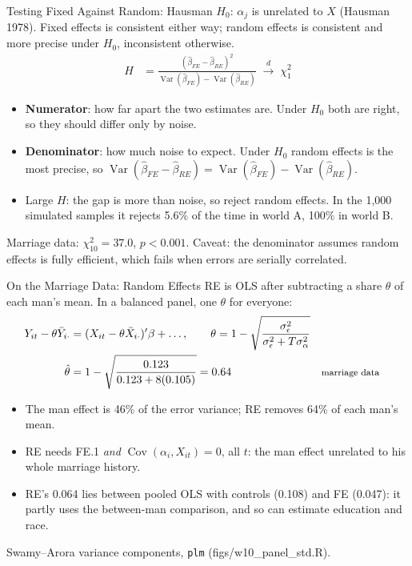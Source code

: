 \documentclass[aspectratio=169,11pt,xcolor=dvipsnames]{beamer}
\newcommand{\srcp}[1]{{\scriptsize\color{gray}(#1)}}
\DeclareMathOperator{\Cov}{Cov}
\DeclareMathOperator{\Var}{Var}
\newcommand{\dto}{\overset{d}{\longrightarrow}}
\begin{document}
\begin{frame}{Testing Fixed Against Random: Hausman}
$H_0$: $\alpha_j$ is unrelated to $X$ \srcp{Hausman 1978}. Fixed effects is consistent either way;
random effects is consistent and more precise under $H_0$, inconsistent otherwise.
\begin{align*}
  H &= \frac{(\hat\beta_{FE} - \hat\beta_{RE})^2}{\Var(\hat\beta_{FE}) - \Var(\hat\beta_{RE})}
   \;\dto\; \chi^2_1
\end{align*}
\begin{itemize}\itemsep3pt
  \item \textbf{Numerator}: how far apart the two estimates are. Under $H_0$ both are right,
        so they should differ only by noise.
  \item \textbf{Denominator}: how much noise to expect. Under $H_0$ random effects is the
        most precise, so $\Var(\hat\beta_{FE} - \hat\beta_{RE}) = \Var(\hat\beta_{FE}) - \Var(\hat\beta_{RE})$.
  \item Large $H$: the gap is more than noise, so reject random effects. In the 1,000
        simulated samples it rejects 5.6\% of the time in world A, 100\% in world B.
\end{itemize}
\vskip2pt
{\small Marriage data: $\chi^2_{10} = 37.0$, $p < 0.001$. Caveat: the denominator assumes random
effects is fully efficient, which fails when errors are serially correlated.}
\end{frame}

\begin{frame}{On the Marriage Data: Random Effects}
RE is OLS after subtracting a share $\theta$ of each man's mean.
In a balanced panel, one $\theta$ for everyone:
\begin{align*}
  Y_{it} - \theta\bar Y_{i\cdot} &= (X_{it} - \theta\bar X_{i\cdot})'\beta + \dots,
  \qquad \theta = 1 - \sqrt{\frac{\sigma_\epsilon^2}{\sigma_\epsilon^2 + T\sigma_\alpha^2}} \\
  \hat\theta &= 1 - \sqrt{\frac{0.123}{0.123 + 8(0.105)}} = 0.64
   && \text{\footnotesize marriage data}
\end{align*}
\begin{itemize}\itemsep3pt
  \item The man effect is 46\% of the error variance; RE removes 64\% of each man's mean.
  \item RE needs FE.1 \emph{and} $\Cov(\alpha_i, X_{it}) = 0$, all $t$: the man effect
        unrelated to his whole marriage history.
  \item RE's 0.064 lies between pooled OLS with controls (0.108) and FE (0.047): it partly
        uses the between-man comparison, and so can estimate education and race.
\end{itemize}
{\footnotesize Swamy--Arora variance components, \texttt{plm} \srcp{figs/w10\_panel\_std.R}.}
\end{frame}
\end{document}
